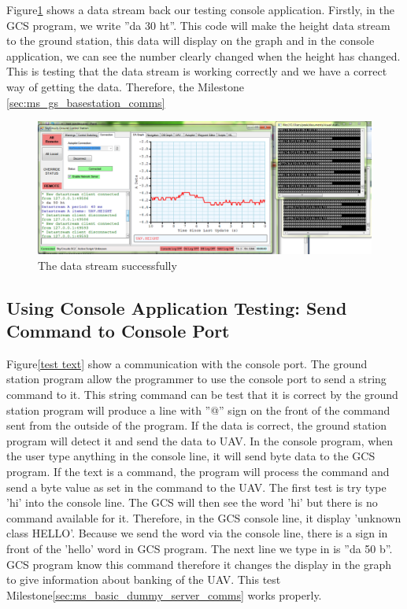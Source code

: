 Figure\ref{test screenshot} shows a data stream back our testing console application.
Firstly, in the GCS program, we write ''da 30 ht''. 
This code will make the height data stream to the ground station, this data will display on the graph and in the console application, we can see the number clearly changed when the height has changed.
This is testing that the data stream is working correctly and we have a correct way of getting the data.
Therefore, the Milestone \ref{sec:ms_gs_basestation_comms}
\begin{figure}[H]
\begin{center}
\includegraphics[scale=1]{testing_screenshots/test_data.png} 
\end{center}
\caption{The data stream successfully\label{test screenshot}}
\end{figure}

\subsection{Using Console Application Testing: Send Command to Console Port}

Figure\ref{test text} show a communication with the console port.
The ground station program allow the programmer to use the console port to send a string command to it. 
This string command can be test that it is correct by the ground station program will produce a line with ''@'' sign on the front of the command sent from the outside of the program.
If the data is correct, the ground station program will detect it and send the data to UAV. 
In the console program, when the user type anything in the console line, it will send byte data to the GCS program.
If the text is a command, the program will process the command and send a byte value as set in the command to the UAV.
The first test is try type 'hi' into the console line.
The GCS will then see the word 'hi' but there is no command available for it.
Therefore, in the GCS console line, it display 'unknown class HELLO'.
Because we send the word via the console line, there is a \@ sign in front of the 'hello' word in GCS program.
The next line we type in is ''da 50 b''.
GCS program know this command therefore it changes the display in the graph to give information about banking of the UAV.
This test Milestone\ref{sec:ms_basic_dummy_server_comms} works properly.

